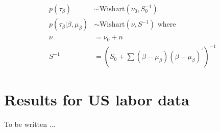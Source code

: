 \begin{align}
  p(\tau_{\beta}) &\sim \text{Wishart}(\nu_0, S_0^{-1}) \\
  p(\tau_{\beta} | \beta, \mu_{\beta}) &\sim \text{Wishart}(\nu, S^{-1}) \text{ where } \\
  \nu &= \nu_0 + n \\
  S^{-1} &= \left(S_0 + \sum (\beta - \mu_{\beta})(\beta - \mu_{\beta})^{\prime}\right)^{-1}
\end{align}

\section{Results for US labor data}

To be written ...

